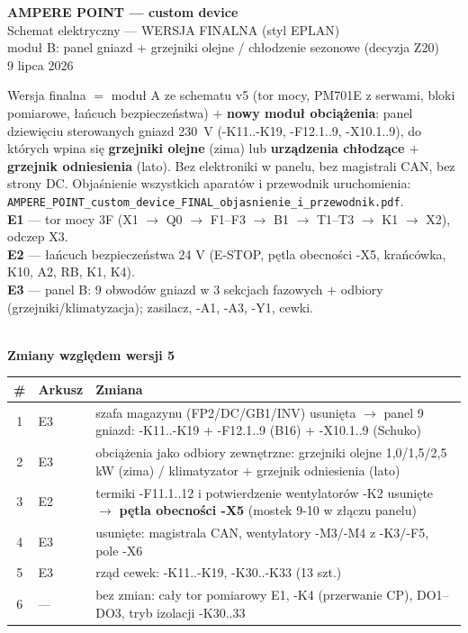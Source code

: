 \documentclass[10pt,a4paper,landscape]{article}
\begin{document}
\begin{center}
\vspace*{1.6cm}
{\LARGE\bfseries AMPERE POINT --- custom device}\\[6pt]
{\Large Schemat elektryczny --- WERSJA FINALNA (styl EPLAN)}\\[6pt]
{\large moduł B: panel gniazd + grzejniki olejne / chłodzenie sezonowe (decyzja Z20)}\\[10pt]
{\normalsize 9 lipca 2026}\\[12pt]
\begin{minipage}{0.86\textwidth}\small
Wersja finalna $=$ moduł A ze schematu v5 (tor mocy, PM701E z serwami, bloki pomiarowe, łańcuch
bezpieczeństwa) $+$ \textbf{nowy moduł obciążenia}: panel dziewięciu sterowanych gniazd 230~V
(-K11..-K19, -F12.1..9, -X10.1..9), do których wpina się \textbf{grzejniki olejne} (zima) lub
\textbf{urządzenia chłodzące $+$ grzejnik odniesienia} (lato). Bez elektroniki w panelu, bez
magistrali CAN, bez strony DC. Objaśnienie wszystkich aparatów i przewodnik uruchomienia:
\texttt{AMPERE\_POINT\_custom\_device\_FINAL\_objasnienie\_i\_przewodnik.pdf}.\\[6pt]
\textbf{E1} --- tor mocy 3F (X1 $\to$ Q0 $\to$ F1--F3 $\to$ B1 $\to$ T1--T3 $\to$ K1 $\to$ X2), odczep X3.\\
\textbf{E2} --- łańcuch bezpieczeństwa 24 V (E-STOP, pętla obecności -X5, krańcówka, K10, A2, RB, K1, K4).\\
\textbf{E3} --- panel B: 9 obwodów gniazd w 3 sekcjach fazowych $+$ odbiory (grzejniki/klimatyzacja); zasilacz, -A1, -A3, -Y1, cewki.
\end{minipage}\\[10pt]
{\small\textbf{Zmiany względem wersji 5}}\\[3pt]
{\scriptsize
\begin{tabular}{clp{}}
\toprule
\# & Arkusz & Zmiana\\
\midrule
1 & E3 & szafa magazynu (FP2/DC/GB1/INV) usunięta $\to$ panel 9 gniazd: -K11..-K19 $+$ -F12.1..9 (B16) $+$ -X10.1..9 (Schuko)\\
2 & E3 & obciążenia jako odbiory zewnętrzne: grzejniki olejne 1,0/1,5/2,5 kW (zima) / klimatyzator $+$ grzejnik odniesienia (lato)\\
3 & E2 & termiki -F11.1..12 i potwierdzenie wentylatorów -K2 usunięte $\to$ \textbf{pętla obecności -X5} (mostek 9-10 w złączu panelu)\\
4 & E3 & usunięte: magistrala CAN, wentylatory -M3/-M4 z -K3/-F5, pole -X6\\
5 & E3 & rząd cewek: -K11..-K19, -K30..-K33 (13 szt.)\\
6 & --- & bez zmian: cały tor pomiarowy E1, -K4 (przerwanie CP), DO1--DO3, tryb izolacji -K30..33\\
\bottomrule
\end{tabular}}
\end{center}
\end{document}
